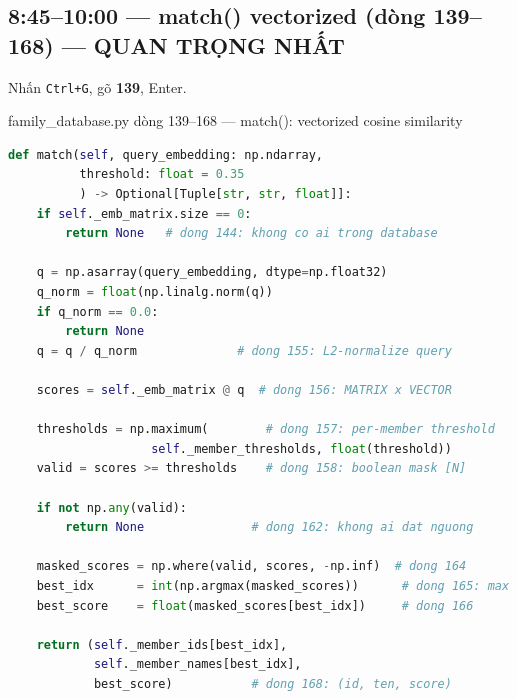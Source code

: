 \documentclass[12pt, a4paper]{article}
\begin{document}
\subsection{8:45--10:00 --- match() vectorized (dòng 139--168) --- QUAN TRỌNG NHẤT}

\begin{doact}
Nhấn \texttt{Ctrl+G}, gõ \textbf{139}, Enter.
\end{doact}

\begin{code}{family\_database.py dòng 139--168 --- match(): vectorized cosine similarity}
\begin{lstlisting}[language=Python, firstnumber=139]
def match(self, query_embedding: np.ndarray,
          threshold: float = 0.35
          ) -> Optional[Tuple[str, str, float]]:
    if self._emb_matrix.size == 0:
        return None   # dong 144: khong co ai trong database

    q = np.asarray(query_embedding, dtype=np.float32)
    q_norm = float(np.linalg.norm(q))
    if q_norm == 0.0:
        return None
    q = q / q_norm              # dong 155: L2-normalize query

    scores = self._emb_matrix @ q  # dong 156: MATRIX x VECTOR

    thresholds = np.maximum(        # dong 157: per-member threshold
                    self._member_thresholds, float(threshold))
    valid = scores >= thresholds    # dong 158: boolean mask [N]

    if not np.any(valid):
        return None               # dong 162: khong ai dat nguong

    masked_scores = np.where(valid, scores, -np.inf)  # dong 164
    best_idx      = int(np.argmax(masked_scores))      # dong 165: max
    best_score    = float(masked_scores[best_idx])     # dong 166

    return (self._member_ids[best_idx],
            self._member_names[best_idx],
            best_score)           # dong 168: (id, ten, score)
\end{lstlisting}
\end{code}
\end{document}
